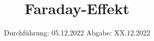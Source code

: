 

\subject{Versuch Nr.V46}
\title{Faraday-Effekt}
\date{%
  Durchführung: 05.12.2022
  \hspace{3em}
  Abgabe: XX.12.2022
}



\maketitle
\thispagestyle{empty}
\tableofcontents
\newpage 








\nocite{*}

\printbibliography{}



